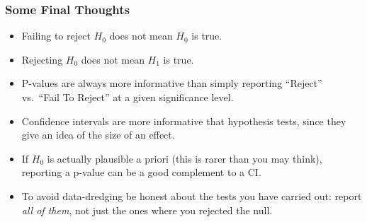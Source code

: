 \documentclass[handout]{beamer}
\begin{document}









\begin{frame}
\frametitle{Some Final Thoughts}
	\begin{itemize}
		\item Failing to reject $H_0$ does not mean $H_0$ is true. 
		\item Rejecting $H_0$ does not mean $H_1$ is true.
		\item P-values are always more informative than simply reporting ``Reject'' vs.\ ``Fail To Reject'' at a given significance level. 
		\item Confidence intervals are more informative that hypothesis tests, since they give an idea of the size of an effect. 
		\item If $H_0$ is actually plausible a priori (this is rarer than you may think), reporting a p-value can be a good complement to a CI. 
		\item To avoid data-dredging be honest about the tests you have carried out: report \emph{all of them}, not just the ones where you rejected the null.
	\end{itemize}

\end{frame}
\end{document}
